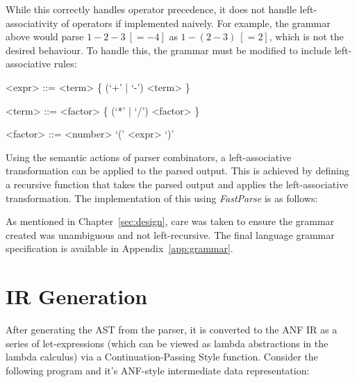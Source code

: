 While this correctly handles operator precedence, it does not handle left-associativity of
operators if implemented naively. For example, the grammar above would parse
\(1 - 2 - 3 ~[= -4]\) as \(1 - (2 - 3) ~[=2]\),
which is not the desired behaviour. To handle this, the grammar must be modified to include
left-associative rules:

\begin{grammar}
    <expr> ::= <term> \{ (`+' | `-') <term> \}

    <term> ::= <factor> \{ (`*' | `/') <factor> \}

    <factor> ::= <number>
    \alt `(' <expr> `)'
\end{grammar}

Using the semantic actions of parser combinators, a left-associative transformation can be
applied to the parsed output. This is achieved by defining a recursive function that takes the
parsed output and applies the left-associative transformation. The implementation of this using
\emph{FastParse} is as follows:


As mentioned in Chapter~\ref{sec:design}, care was taken to ensure the grammar created was
unambiguous and not left-recursive. The final language grammar specification is available in
Appendix~\ref{app:grammar}.

\section{IR Generation}

After generating the AST from the parser, it is converted to the ANF IR as a series of let-expressions
(which can be viewed as lambda abstractions in the lambda calculus) via a Continuation-Passing Style
function. Consider the following program and it's ANF-style intermediate data representation:

